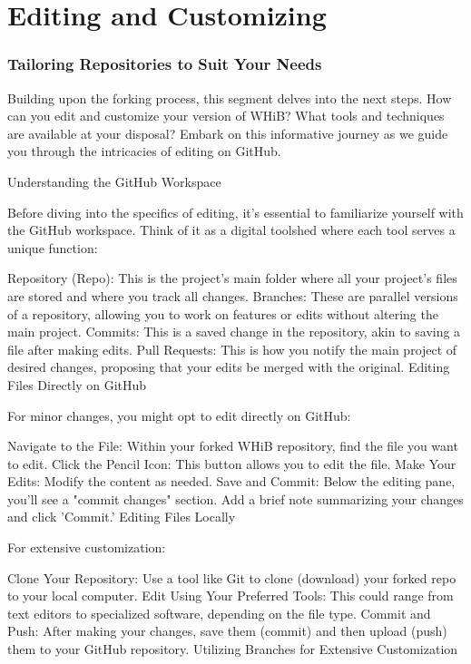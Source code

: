 \documentclass[a4paper,12pt]{book}
\begin{document}
\chapter{Editing and Customizing}
\subsection*{Tailoring Repositories to Suit Your Needs}
Building upon the forking process, this segment delves into the next steps. How can you edit and customize your version of WHiB? What tools and techniques are available at your disposal? Embark on this informative journey as we guide you through the intricacies of editing on GitHub.

Understanding the GitHub Workspace

Before diving into the specifics of editing, it's essential to familiarize yourself with the GitHub workspace. Think of it as a digital toolshed where each tool serves a unique function:

Repository (Repo): This is the project's main folder where all your project's files are stored and where you track all changes.
Branches: These are parallel versions of a repository, allowing you to work on features or edits without altering the main project.
Commits: This is a saved change in the repository, akin to saving a file after making edits.
Pull Requests: This is how you notify the main project of desired changes, proposing that your edits be merged with the original.
Editing Files Directly on GitHub

For minor changes, you might opt to edit directly on GitHub:

Navigate to the File: Within your forked WHiB repository, find the file you want to edit.
Click the Pencil Icon: This button allows you to edit the file.
Make Your Edits: Modify the content as needed.
Save and Commit: Below the editing pane, you'll see a "commit changes" section. Add a brief note summarizing your changes and click 'Commit.'
Editing Files Locally

For extensive customization:

Clone Your Repository: Use a tool like Git to clone (download) your forked repo to your local computer.
Edit Using Your Preferred Tools: This could range from text editors to specialized software, depending on the file type.
Commit and Push: After making your changes, save them (commit) and then upload (push) them to your GitHub repository.
Utilizing Branches for Extensive Customization
\end{document}
